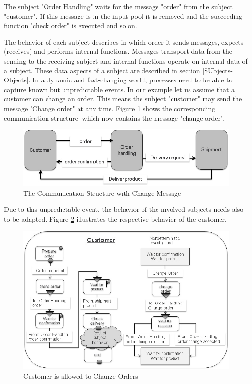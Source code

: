 The subject "Order Handling" waits for the message "order" from the subject "customer". If this message is in the input pool it is removed and the succeeding function "check order" is executed and so on.

The behavior of each subject describes in which order it sends messages, expects (receives) and performs internal functions. Messages transport data from the sending to the receiving subject and internal functions operate on internal data of a subject. These data aspects of a subject are described in section \ref{SUbjects-Objects}. In a dynamic and fast-changing world, processes need to be able to capture known but unpredictable events. In our example let us assume that a customer can change an order. This means the subject "customer" may send the message "Change order" at any time. Figure \ref{fig:ordercomstructure} shows the corresponding communication structure, which now contains the message "change order".

\begin{figure}[htbp]
	\centering
	\includegraphics[width=0.7\linewidth]{Figures/Ontology/SubjectExecution/OrderComStructure}
	\caption[The Communication Structure with Change Message]{The Communication Structure with Change Message}
	\label{fig:ordercomstructure}
\end{figure}

Due to this unpredictable event, the behavior of the involved subjects needs also to be adapted. Figure \ref{fig:ordercustomerchange} illustrates the respective behavior of the customer. 

\begin{figure}[htbp]
	\centering
	\includegraphics[width=0.9\linewidth]{Figures/Ontology/SubjectExecution/OrderCustomerChange}
	\caption[Customer is allowed to Change Orders]{Customer is allowed to Change Orders}
	\label{fig:ordercustomerchange}
\end{figure}

